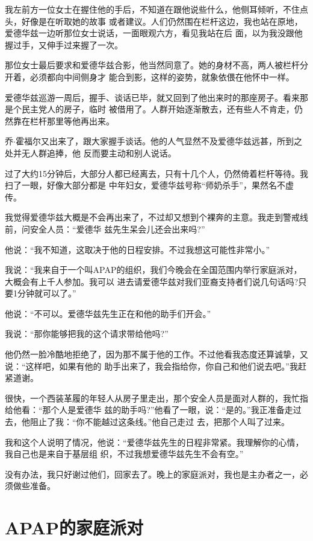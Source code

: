 ﻿\documentclass[11pt]{article}
\begin{document}
我左前方一位女士在握住他的手后，不知道在跟他说些什么，他侧耳倾听，不住点头，好像是在听取她的故事
或者建议。人们仍然围在栏杆这边，我也站在原地，爱德华兹一边听那位女士说话，一面眼观六方，看见我站在后
面，以为我没跟他握过手，又伸手过来握了一次。

那位女士最后要求和爱德华兹合影，他当然同意了。她的身材不高，两人被栏杆分开着，必须都向中间侧身才
能合到影，这样的姿势，就象依偎在他怀中一样。

爱德华兹巡游一周后，握手、谈话已毕，就又回到了他出来时的那座房子。看来那是个民主党人的房子，临时
被借用了。人群开始逐渐散去，还有些人不肯走，仍然靠在栏杆那里等他再出来。

乔$\cdot$霍福尔又出来了，跟大家握手谈话。他的人气显然不及爱德华兹远甚，所到之处并无人群追捧，他
反而要主动和别人说话。

过了大约15分钟后，大部分人都已经离去，只有十几个人，仍然倚着栏杆等待。我扫了一眼，好像大部分都是
中年妇女，爱德华兹号称``师奶杀手''，果然名不虚传。

我觉得爱德华兹大概是不会再出来了，不过却又想到个裸奔的主意。我走到警戒线前，问安全人员：``爱德华
兹先生呆会儿还会出来吗?''

他说：``我不知道，这取决于他的日程安排。不过我想这可能性非常小。''

我说：``我来自于一个叫APAP的组织，我们今晚会在全国范围内举行家庭派对，大概会有上千人参加。我可以
进去请爱德华兹对我们亚裔支持者们说几句话吗?只要1分钟就可以了。''

他说：``不可以。爱德华兹先生正在和他的助手们开会。''

我说：``那你能够把我的这个请求带给他吗?''

他仍然一脸冷酷地拒绝了，因为那不属于他的工作。不过他看我态度还算诚挚，又说：``这样吧，如果有他的
助手出来了，我会指给你，你自己和他们说去吧。''我赶紧道谢。

很快，一个西装革履的年轻人从房子里走出，那个安全人员是面对人群的，我忙指给他看：``那个人是爱德华
兹的助手吗?''他看了一眼，说：``是的。''我正准备走过去，他阻止了我：``你不能越过这条线。''他自己走过
去，把那个人叫了过来。

我和这个人说明了情况，他说：``爱德华兹先生的日程非常紧。我理解你的心情，我自己也是来自于基层组
织，不过我想爱德华兹先生不会有空。''

没有办法，我只好谢过他们，回家去了。晚上的家庭派对，我也是主办者之一，必须做些准备。

\section{APAP的家庭派对}
\end{document}
